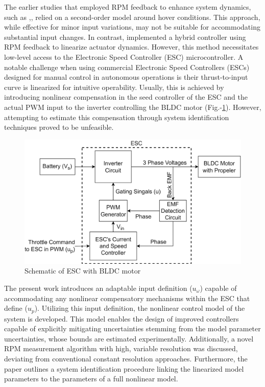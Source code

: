 The earlier studies that employed RPM feedback to enhance system dynamics, such
as \cite{pounds2009design},\cite{pounds2007system},\cite{mahony2012multirotor}
relied on a second-order model around hover conditions. This approach, while
effective for minor input variations, may not be suitable for accommodating
substantial input changes. In contrast, \cite{franchi2017adaptive} implemented
a hybrid controller using RPM feedback to linearize actuator dynamics. However,
this method necessitates low-level access to the Electronic Speed Controller
(ESC) microcontroller. A notable challenge when using commercial Electronic
Speed Controllers (ESCs) designed for manual control in autonomous operations
is their thrust-to-input curve is linearized \cite{Phang} for intuitive
operability. Usually, this is achieved by introducing nonlinear compensation in
the seed controller of the ESC and the actual PWM input to the inverter
controlling the BLDC motor (Fig.-\ref{fig::bldc_diag}). However, attempting to
estimate this compensation through system identification techniques proved to
be unfeasible.
\begin{figure}[h]
    \centering
    \includegraphics[width = \figsize]{./figs/figs_acc/schematic/esc_schematic.png}
    \caption{Schematic of ESC with BLDC motor}
    \label{fig::bldc_diag}
\end{figure}

The present work introduces an adaptable input definition ($u_\omega$) capable of accommodating any nonlinear compensatory mechanisms within the ESC that define ($u_p$). Utilizing this input definition, the nonlinear control model of the system is developed. This model enables the design of improved controllers capable of explicitly mitigating uncertainties stemming from the model parameter uncertainties, whose bounds are estimated experimentally. Additionally, a novel RPM measurement algorithm with high, variable resolution was discussed, deviating from conventional constant resolution approaches. Furthermore, the paper outlines a system identification procedure linking the linearized model parameters to the parameters of a full nonlinear model.

